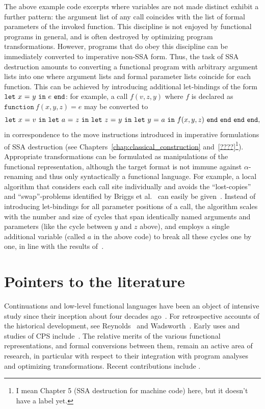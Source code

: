 The above example code excerpts where variables are not made distinct
exhibit a further pattern: the argument list of any call coincides
with the list of formal parameters of the invoked function. This
discipline is not enjoyed by functional programs in general, and is
often destroyed by optimizing program transformations. However,
programs that do obey this discipline can be immediately converted to
imperative non-SSA form. Thus, the task of SSA destruction amounts to
converting a functional program with arbitrary argument lists into one
where argument lists and formal parameter lists coincide for each
function. This can be achieved by introducing additional let-bindings
of the form $\mathtt{let}\ {x}\ \mathtt{=}\ {y}\ \mathtt{in}\ {e}\ \mathtt{end}$: for example, a call $f(v,z,y)$ where $f$
is declared as $\mathtt{function}\ f(x,y,z) = e$ may be converted to
$$\mathtt{let}\ {x}\ \mathtt{=}\ {v}\ \mathtt{in}\ {\mathtt{let}\ {a}\ \mathtt{=}\ {z}\ \mathtt{in}\ {\mathtt{let}\ {z}\ \mathtt{=}\ {y}\ \mathtt{in}\ {\mathtt{let}\ {y}\ \mathtt{=}\ {a}\ \mathtt{in}\ {f(x,y,z)}\ \mathtt{end}}\ \mathtt{end}}\ \mathtt{end}}\ \mathtt{end},$$ in
correspondence to the move instructions introduced in imperative
formulations of SSA destruction (see
Chapters~\ref{chap:classical_construction} and~\ref{????}\footnote{I
mean Chapter 5 (SSA destruction for machine code) here, but it doesn't
have a label yet.}). Appropriate transformations can be formulated as
manipulations of the functional representation, although the target
format is not immune against $\alpha$-renaming and thus only
syntactically a functional language. For example, a local algorithm
that considers each call site individually and avoids the
``lost-copies'' and ``swap''-problems identified by Briggs et
al.~\cite{DBLP:journals/spe/BriggsCHS98} can easily be
given~\cite{DBLP:journals/entcs/Beringer07}. Instead of introducing
let-bindings for all parameter positions of a call, the algorithm
scales with the number and size of cycles that span identically named
arguments and parameters (like the cycle between $y$ and $z$ above),
and employs a single additional variable (called $a$ in the above
code) to break all these cycles one by one, in line with the results
of~\cite{May}.


\section{Pointers to the literature}
\label{section:Part1:Semantics:Literature}

Continuations and low-level functional languages have been an object
of intensive study since their inception about four decades
ago~\cite{vanWijngaarden1966,Landin1965}.  For retrospective accounts
of the historical development, see Reynolds~\cite{Reynolds:LSC1993}
and Wadsworth~\cite{Wadsworth00}. Early uses and studies of CPS
include~\cite{Reynolds:1972,Plotkin75}.  The relative merits of the
various functional representations, and formal conversions between
them, remain an active area of research, in particular with respect to
their integration with program analyses and optimizing
transformations.  Recent contributions include
\cite{DBLP:journals/jfp/DanvyMN07,DBLP:journals/lisp/Reppy02,DBLP:conf/icfp/Kennedy07}.

